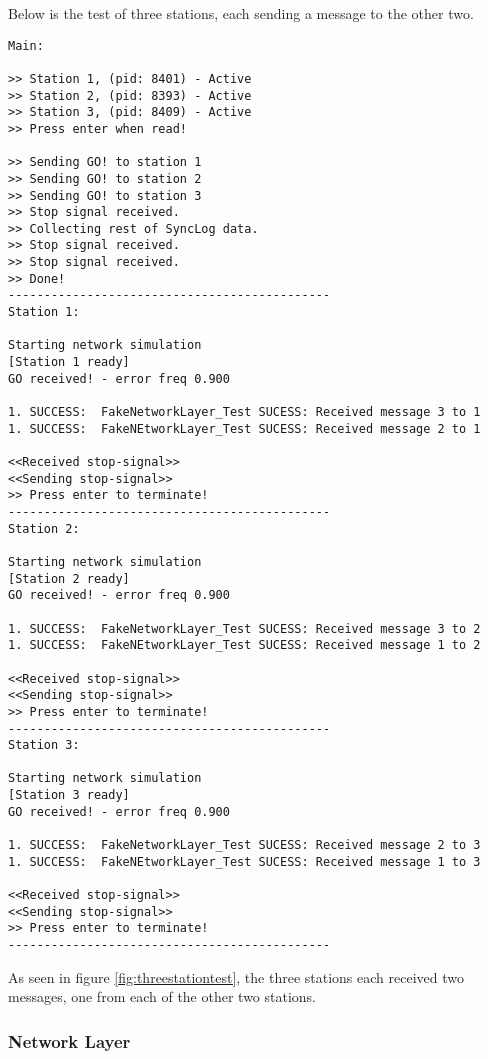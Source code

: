 Below is the test of three stations, each sending a message to the other two.
\begin{lstlisting}
Main:

>> Station 1, (pid: 8401) - Active
>> Station 2, (pid: 8393) - Active
>> Station 3, (pid: 8409) - Active
>> Press enter when read!

>> Sending GO! to station 1
>> Sending GO! to station 2
>> Sending GO! to station 3
>> Stop signal received.
>> Collecting rest of SyncLog data.
>> Stop signal received.
>> Stop signal received.
>> Done!
---------------------------------------------
Station 1:

Starting network simulation
[Station 1 ready]
GO received! - error freq 0.900

1. SUCCESS:  FakeNetworkLayer_Test SUCESS: Received message 3 to 1
1. SUCCESS:  FakeNEtworkLayer_Test SUCESS: Received message 2 to 1

<<Received stop-signal>>
<<Sending stop-signal>>
>> Press enter to terminate!
---------------------------------------------
Station 2:

Starting network simulation
[Station 2 ready]
GO received! - error freq 0.900

1. SUCCESS:  FakeNetworkLayer_Test SUCESS: Received message 3 to 2
1. SUCCESS:  FakeNEtworkLayer_Test SUCESS: Received message 1 to 2

<<Received stop-signal>>
<<Sending stop-signal>>
>> Press enter to terminate!
---------------------------------------------
Station 3:

Starting network simulation
[Station 3 ready]
GO received! - error freq 0.900

1. SUCCESS:  FakeNetworkLayer_Test SUCESS: Received message 2 to 3
1. SUCCESS:  FakeNEtworkLayer_Test SUCESS: Received message 1 to 3

<<Received stop-signal>>
<<Sending stop-signal>>
>> Press enter to terminate!
---------------------------------------------
\end{lstlisting}


As seen in figure \ref{fig:threestationtest}, the three stations each received two messages, one from each of the other two stations.



\subsubsection{Network Layer}



